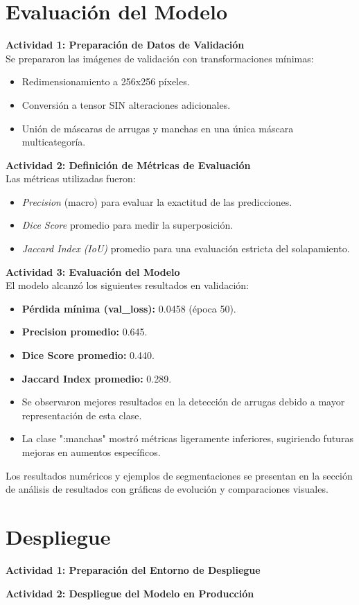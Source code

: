 \section{Evaluación del Modelo}

\textbf{Actividad 1: Preparación de Datos de Validación}\\
Se prepararon las imágenes de validación con transformaciones mínimas:
\begin{itemize}
  \item Redimensionamiento a 256x256 píxeles.  
  \item Conversión a tensor SIN alteraciones adicionales.  
  \item Unión de máscaras de arrugas y manchas en una única máscara multicategoría.  
\end{itemize}

\textbf{Actividad 2: Definición de Métricas de Evaluación}\\
Las métricas utilizadas fueron:
\begin{itemize}
  \item \textit{Precision} (macro) para evaluar la exactitud de las predicciones.  
  \item \textit{Dice Score} promedio para medir la superposición.  
  \item \textit{Jaccard Index (IoU)} promedio para una evaluación estricta del solapamiento.  
\end{itemize}

\textbf{Actividad 3: Evaluación del Modelo}\\
El modelo alcanzó los siguientes resultados en validación:
\begin{itemize}
  \item \textbf{Pérdida mínima (val\_loss):} 0.0458 (época 50).  
  \item \textbf{Precision promedio:} 0.645.  
  \item \textbf{Dice Score promedio:} 0.440.  
  \item \textbf{Jaccard Index promedio:} 0.289.  
  \item Se observaron mejores resultados en la detección de arrugas debido a mayor representación de esta clase.  
  \item La clase ":manchas" mostró métricas ligeramente inferiores, sugiriendo futuras mejoras en aumentos específicos.  
\end{itemize}

Los resultados numéricos y ejemplos de segmentaciones se presentan en la sección de análisis de resultados con gráficas de evolución y comparaciones visuales.


\section{Despliegue}

\textbf{Actividad 1: Preparación del Entorno de Despliegue}

\textbf{Actividad 2: Despliegue del Modelo en Producción}
